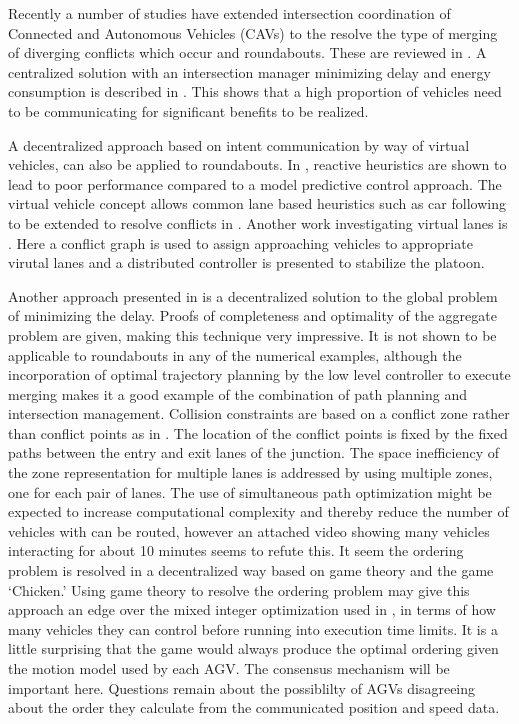 \documentclass[11pt]{article} %
\begin{document}
Recently a number of studies have extended intersection coordination of Connected and Autonomous Vehicles (CAVs) to the resolve the type of merging of diverging conflicts which occur and roundabouts. These are reviewed in \cite{Rios-Torres2017}. A centralized solution with an intersection manager minimizing delay and energy consumption is described in \cite{Zhao2018}. This shows that a high proportion of vehicles need to be communicating for significant benefits to be realized. 

A decentralized approach based on intent communication by way of virtual vehicles, can also be applied to roundabouts. In \cite{Debada2016}, reactive heuristics are shown to lead to poor performance compared to a model predictive control approach. The virtual vehicle concept allows common lane based heuristics such as car following to be extended to resolve conflicts in  \cite{Debada2018}. Another work investigating virtual lanes is \cite{Xu2018}. Here a conflict graph is used to assign approaching vehicles to appropriate virutal lanes and a distributed controller is presented to stabilize the platoon.

Another approach presented in \cite{Liu2018} is a decentralized solution to the global problem of minimizing the delay. Proofs of completeness and optimality of the aggregate problem are given, making this technique very impressive. It is not shown to be applicable to roundabouts in any of the numerical examples, although the incorporation of optimal trajectory planning by the low level controller to execute merging makes it a good example of the combination of path planning and intersection management. Collision constraints are based on a conflict zone rather than conflict points as in \cite{Levin2017}. The location of the conflict points is fixed by the fixed paths between the entry and exit lanes of the junction. The space inefficiency of the zone representation for multiple lanes is addressed by using multiple zones, one for each pair of lanes. The use of simultaneous path optimization might be expected to increase computational complexity and thereby reduce the number of vehicles with can be routed, however an attached video showing many vehicles interacting for about 10 minutes seems to refute this. It seem the ordering problem is resolved in a decentralized way based on game theory and the game `Chicken.' Using game theory to resolve the ordering problem may give this approach an edge over the mixed integer optimization used in \cite{Levin2017}, in terms of how many vehicles they can control before running into execution time limits. It is a little surprising that the game would always produce the optimal ordering given the motion model used by each AGV. The consensus mechanism will be important here. Questions remain about the possiblilty of AGVs disagreeing about the order they calculate from the communicated position and speed data. 
\end{document}
